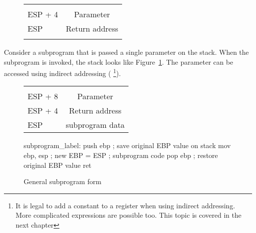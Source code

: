 \begin{figure}
\centering
\begin{tabular}{l|c|}
\cline{2-2}
&  \\ \cline{2-2}
ESP + 4 & Parameter \\ \cline{2-2}
ESP     & Return address \\ \cline{2-2}
 & \\ \cline{2-2}
\end{tabular}
\caption{}
\label{fig:stack1}
\end{figure}
Consider 
a subprogram that is passed a single parameter on the stack. When
the subprogram is invoked, the stack looks like Figure~\ref{fig:stack1}.
The parameter can be accessed using indirect addressing ({\code [ESP+4]}
\footnote{It is legal to add a constant to a register when using indirect
addressing. More complicated expressions are possible too. This topic is covered
in the next chapter}).
\begin{figure}
\centering
\begin{tabular}{l|c|}
\cline{2-2}
&  \\ \cline{2-2}
ESP + 8 & Parameter \\ \cline{2-2}
ESP + 4 & Return address \\ \cline{2-2}
ESP     & subprogram data \\ \cline{2-2}
\end{tabular}
\caption{}
\label{fig:stack2}
\end{figure}

\begin{figure}[t]
\begin{AsmCodeListing}[frame=single]
subprogram_label:
      push   ebp           ; save original EBP value on stack
      mov    ebp, esp      ; new EBP = ESP
; subprogram code
      pop    ebp           ; restore original EBP value
      ret
\end{AsmCodeListing}
\caption{General subprogram form \label{fig:subskel1}}
\end{figure}

